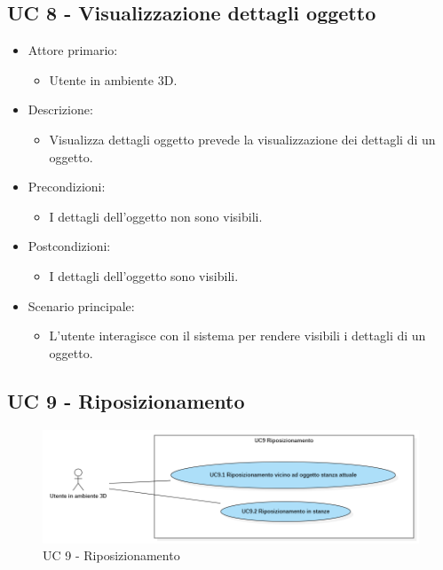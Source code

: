 \subsection{UC 8 - Visualizzazione dettagli oggetto}
\begin{itemize}

	\item Attore primario: 
	\begin{itemize}
		\item Utente in ambiente 3D.
	\end{itemize}
	\item Descrizione:
	\begin{itemize}
		\item Visualizza dettagli oggetto prevede la visualizzazione dei dettagli di un oggetto.
	\end{itemize}
	
	\item Precondizioni:
	\begin{itemize}
		\item I dettagli dell'oggetto non sono visibili.
	\end{itemize}
	
	\item Postcondizioni:
	\begin{itemize}
		\item I dettagli dell'oggetto sono visibili.
	\end{itemize}
	
	\item Scenario principale:
	\begin{itemize}
		\item L'utente interagisce con il sistema per rendere visibili i dettagli di un oggetto.
	\end{itemize}
	
\end{itemize}

\pagebreak

\subsection{UC 9 - Riposizionamento}

\begin{figure}[H]
  \renewcommand{\thefigure}{8}
  \includegraphics[width=\linewidth]{./res/images/UC9.png}
  \caption{UC 9 - Riposizionamento}
  \label{fig:UC 9}
\end{figure}

